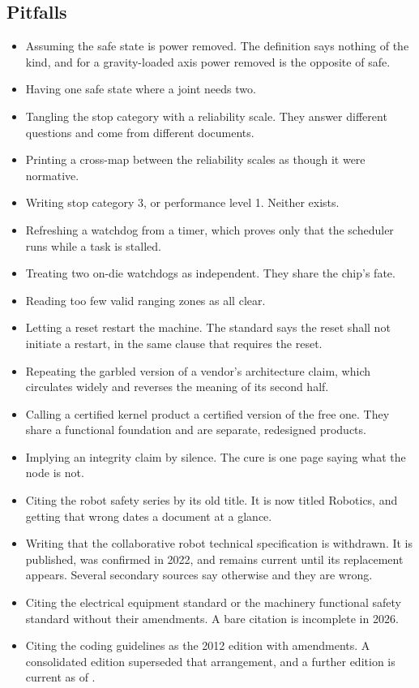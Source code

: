 \subsection*{Pitfalls}

\begin{itemize}
\item Assuming the safe state is power removed. The definition says nothing of
the kind, and for a gravity-loaded axis power removed is the opposite of safe.
\item Having one safe state where a joint needs two.
\item Tangling the stop category with a reliability scale. They answer different
questions and come from different documents.
\item Printing a cross-map between the reliability scales as though it were
normative.
\item Writing stop category 3, or performance level 1. Neither exists.
\item Refreshing a watchdog from a timer, which proves only that the scheduler
runs while a task is stalled.
\item Treating two on-die watchdogs as independent. They share the chip's fate.
\item Reading too few valid ranging zones as all clear.
\item Letting a reset restart the machine. The standard says the reset shall not
initiate a restart, in the same clause that requires the reset.
\item Repeating the garbled version of a vendor's architecture claim, which
circulates widely and reverses the meaning of its second half.
\item Calling a certified kernel product a certified version of the free one.
They share a functional foundation and are separate, redesigned products.
\item Implying an integrity claim by silence. The cure is one page saying what
the node is not.
\item Citing the robot safety series by its old title. It is now titled
Robotics, and getting that wrong dates a document at a glance.
\item Writing that the collaborative robot technical specification is withdrawn.
It is published, was confirmed in 2022, and remains current until its replacement
appears. Several secondary sources say otherwise and they are wrong.
\item Citing the electrical equipment standard or the machinery functional
safety standard without their amendments. A bare citation is incomplete in 2026.
\item Citing the coding guidelines as the 2012 edition with amendments. A
consolidated edition superseded that arrangement, and a further edition is
current as of .
\end{itemize}

